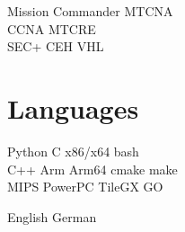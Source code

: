 \documentclass[]{resume}
\begin{document}
\begin{minipage}[t]{0.30\textwidth}
\sectionsep

Mission Commander \textbullet{} MTCNA \\
CCNA \textbullet{} MTCRE \\
SEC+ \textbullet{} CEH \textbullet{} VHL \\


\sectionsep


\section{Languages}
Python \textbullet{} C \textbullet{} x86/x64 \textbullet{} bash \\
\sectionsep
{}
C++ \textbullet{} Arm \textbullet{} Arm64 \textbullet{} cmake \textbullet{} make \\
\sectionsep
{}
MIPS \textbullet{} PowerPC \textbullet{} TileGX \textbullet{} GO \\

\sectionsep

English \textbullet{} German \\


%
%

\end{minipage}
\hfill
\end{document}
